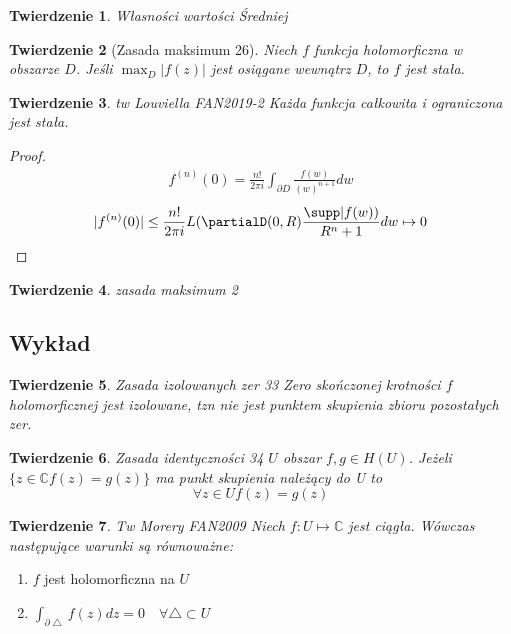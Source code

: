 \documentclass{article}
\theoremstyle{plain}
\newtheorem*{theorem}{Twierdzenie}
\theoremstyle{definition}
\theoremstyle{remark}
\newcommand{\abs}[1]{\left|#1\right|} %
\begin{document}
\begin{theorem}{Własności wartości Średniej}
\end{theorem}

\begin{theorem}[Zasada maksimum 26]
Niech $ f $ funkcja holomorficzna w obszarze $ D $.
  Jeśli $ \max_D \abs{f(z)} $ jest osiągane wewnątrz $ D $, to $ f $ jest stała.
\end{theorem}

\begin{theorem}{tw Louviella FAN2019-2}
 Każda funkcja całkowita i ograniczona jest stała.
\end{theorem}


\begin{proof}
 \begin{align*}
 f^{(n)}(0) = \frac{n!}{2 \pi i} \int_{\partial D} \frac{f(w)}{(w)^{n+1}} dw
 \end{align*}
 \[
   |f^{(n)}(0)| \leq \frac{n!}{2 \pi i} L(\partialD(0,R) \frac{\supp|f(w))}{R^n+1} dw \mapsto 0
 \]
\end{proof}

\begin{theorem}{zasada maksimum 2}

\end{theorem}

\subsection{Wykład}

\begin{theorem}{Zasada izolowanych zer 33}
Zero skończonej krotności $f$ holomorficznej jest izolowane, tzn nie jest punktem skupienia zbioru pozostałych zer.
\end{theorem}

\begin{theorem}{Zasada identyczności 34}
$U $ obszar $f, g \in H(U)$. Jeżeli $\{z \in \mathbb{C} f(z) = g(z) \}$ ma punkt skupienia należący do U to 
\[
\forall{z\in U} f(z) = g(z)
\]
\end{theorem}

\begin{theorem}{Tw Morery FAN2009}
Niech $f:U \mapsto \mathbb{C}$ jest ciągła. Wówczas następujące warunki są równoważne:
\end{theorem}
\begin{enumerate}
    \item $f$ jest holomorficzna na $U$
    \item $\int_{\partial \bigtriangleup} f(z)dz = 0 \quad \forall{\bigtriangleup} \subset U$
\end{enumerate}{}
\end{document}
